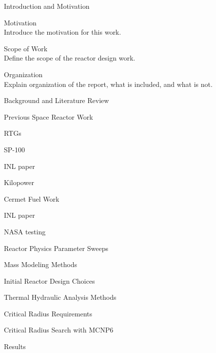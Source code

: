 \begin{outline}
  \item { Introduction and Motivation}
  \begin{outline}
    \item { Motivation } \\
        Introduce the motivation for this work.
    \item { Scope of Work } \\
        Define the scope of the reactor design work.
    \item { Organization } \\
      Explain organization of the report, what is included, and what
      is not.
  \end{outline}
  \item { Background and Literature Review }
      \begin{outline}
          \item { Previous Space Reactor Work }
                \begin{outline}
                \item {RTGs}
                \item {SP-100}
                \item {INL paper}
                \item {Kilopower}
                \end{outline}
           \item { Cermet Fuel Work }
                \begin{outline}
                \item {INL paper}
                \item {NASA testing}
                \end{outline}
      \end{outline}
  \item { Reactor Physics Parameter Sweeps }
  \item { Mass Modeling Methods }
      \begin{outline}
      \item { Initial Reactor Design Choices }
      \item { Thermal Hydraulic Analysis Methods }
      \item { Critical Radius Requirements }
          \begin{outline}
          \item { Critical Radius Search with MCNP6}
          \item { Results }
              \begin{outline}

\end{outline}
\end{outline}
\end{outline}
\end{outline}
